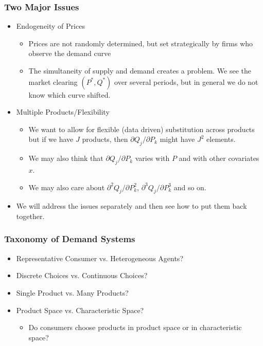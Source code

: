 \documentclass[xcolor=pdftex,dvipsnames,table,mathserif,aspectratio=169]{beamer}
\begin{document}
\begin{frame}
\frametitle{Two Major Issues}
\begin{itemize}
\item Endogeneity of Prices
\begin{itemize}
\item Prices are not randomly determined, but set strategically by firms who observe the demand curve
\item The \alert{simultaneity} of supply and demand creates a problem. We see the market clearing $(P^*,Q^*)$ over several periods, but in general we do not know which curve shifted.
\end{itemize}
\item Multiple Products/Flexibility
\begin{itemize}
\item We want to allow for flexible (data driven) substitution across products but if we have $J$ products, then $\partial Q_j / \partial P_k$ might have $J^2$ elements.
\item We may also think that $\partial Q_j / \partial P_k$ varies with $P$ and with other covariates $x$.
\item We may also care about $\partial^2 Q_j / \partial P_k^2$, $\partial^3 Q_j / \partial P_k^3$ and so on.
\end{itemize}
\item We will address the issues separately and then see how to put them back together.
\end{itemize}
\end{frame}

\begin{frame}
\frametitle{Taxonomy of Demand Systems}
\begin{itemize}
\item Representative Consumer vs. Heterogeneous Agents?
\item Discrete Choices vs. Continuous Choices?
\item Single Product vs. Many Products?
\item Product Space vs. Characteristic Space?
\begin{itemize}
\item Do consumers choose products in product space or in characteristic space?
\end{itemize}
\end{itemize}
\end{frame}
\end{document}

